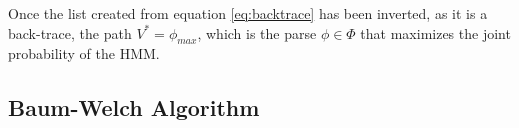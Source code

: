 Once the list created from equation \ref{eq:backtrace} has been inverted, as it is a back-trace, the path $V^* = \phi_{max}$, which is the parse $\phi \in \Phi$ that maximizes the joint probability of the HMM. 
\subsection{Baum-Welch Algorithm}
